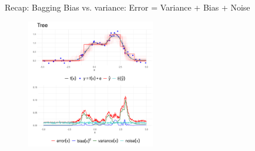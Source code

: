 \documentclass[10pt,compress,t,notes=noshow, xcolor=table]{beamer}
\begin{document}

\begin{vbframe}{Recap: Bagging}
Bias vs. variance: Error = Variance + Bias + Noise
\begin{figure}
    \centering
    \includegraphics[width=0.5\textwidth]{figure_man/bagging_variance_bias_tree.png}
    \label{fig:bagging_tree}
\end{figure}

\end{vbframe}

\end{document}
